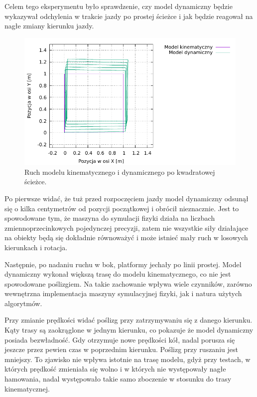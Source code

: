 		Celem tego eksperymentu było sprawdzenie, czy model dynamiczny będzie wykazywał odchylenia w trakcie jazdy po prostej ścieżce 
		i jak będzie reagował na nagłe zmiany kierunku jazdy.
		
		\begin{figure}[H]
			\centering
			\includegraphics[width=\textwidth]{plots/square.pdf}
				\caption{Ruch modelu kinematycznego i dynamicznego po kwadratowej ścieżce.}
			\label{plot:gramofon_square}
		\end{figure}
		
		Po pierwsze widać, że tuż przed rozpoczęciem jazdy model dynamiczny odsunął się o kilka centymetrów od pozycji początkowej i obrócił nieznacznie.
		Jest to spowodowane tym, że maszyna do symulacji fizyki działa na liczbach zmiennoprzecinkowych pojedynczej precyzji,
		zatem nie wszystkie siły działające na obiekty będą się dokładnie równoważyć i może istnieć mały ruch w losowych kierunkach i rotacja.
		
		Następnie, po nadaniu ruchu w bok, platformy jechały po linii prostej.
		Model dynamiczny wykonał większą trasę do modelu kinematycznego, co nie jest spowodowane poślizgiem.
		Na takie zachowanie wpływa wiele czynników, zarówno wewnętrzna implementacja maszyny symulacyjnej fizyki, jak i natura użytych algorytmów.
		
		Przy zmianie prędkości widać poślizg przy zatrzymywaniu się z danego kierunku.
		Kąty trasy są zaokrąglone w jednym kierunku, co pokazuje że model dynamiczny posiada bezwładność. 
		Gdy otrzymuje nowe prędkości kół, nadal porusza się jeszcze przez pewien czas w poprzednim kierunku.
		Poślizg przy ruszaniu jest mniejszy.
		To zjawisko nie wpływa istotnie na trasę modelu, gdyż przy testach, w których prędkość zmieniała się wolno i w których nie występowały nagłe hamowania,
		nadal występowało takie samo zboczenie w stosunku do trasy kinematycznej.
		
